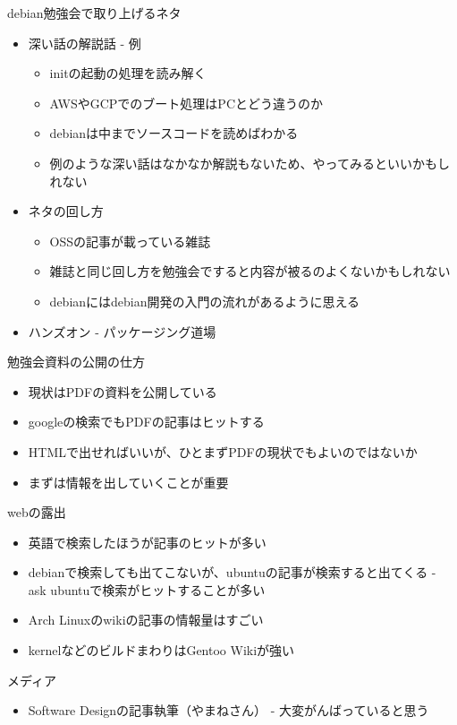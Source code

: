 \documentclass[mingoth,a4paper]{jsarticle}
\begin{document}
debian勉強会で取り上げるネタ
\begin{itemize}
\item 深い話の解説話
    - 例
  \begin{itemize}
    \item initの起動の処理を読み解く
    \item AWSやGCPでのブート処理はPCとどう違うのか
  \end{itemize}
  \begin{itemize}
    \item debianは中までソースコードを読めばわかる
    \item 例のような深い話はなかなか解説もないため、やってみるといいかもしれない
  \end{itemize}
\item ネタの回し方
  \begin{itemize}
  \item OSSの記事が載っている雑誌
  \item 雑誌と同じ回し方を勉強会ですると内容が被るのよくないかもしれない
  \item debianにはdebian開発の入門の流れがあるように思える
  \end{itemize}
\item ハンズオン
    - パッケージング道場
\end{itemize}
勉強会資料の公開の仕方
\begin{itemize}
\item 現状はPDFの資料を公開している
\item googleの検索でもPDFの記事はヒットする
\item HTMLで出せればいいが、ひとまずPDFの現状でもよいのではないか
\item まずは情報を出していくことが重要
\end{itemize}
webの露出
\begin{itemize}
\item 英語で検索したほうが記事のヒットが多い
\item debianで検索しても出てこないが、ubuntuの記事が検索すると出てくる
    - ask ubuntuで検索がヒットすることが多い
\item Arch Linuxのwikiの記事の情報量はすごい
\item kernelなどのビルドまわりはGentoo Wikiが強い
\end{itemize}
メディア
\begin{itemize}
\item Software Designの記事執筆（やまねさん）
    - 大変がんばっていると思う
\end{itemize}
\end{document}
